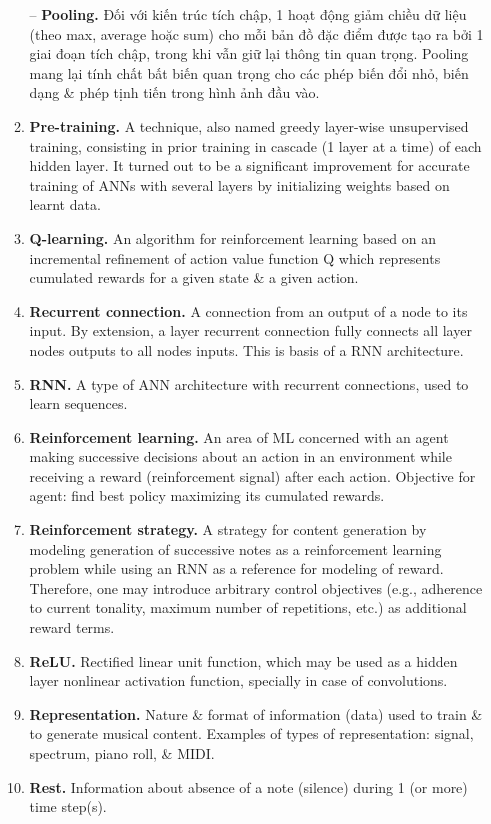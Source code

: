 \documentclass{article}
\begin{document}
\begin{itemize}
\begin{enumerate}
		-- {\bf Pooling.} Đối với kiến trúc tích chập, 1 hoạt động giảm chiều dữ liệu (theo max, average hoặc sum) cho mỗi bản đồ đặc điểm được tạo ra bởi 1 giai đoạn tích chập, trong khi vẫn giữ lại thông tin quan trọng. Pooling mang lại tính chất bất biến quan trọng cho các phép biến đổi nhỏ, biến dạng \& phép tịnh tiến trong hình ảnh đầu vào.
		\item {\bf Pre-training.} A technique, also named greedy layer-wise unsupervised training, consisting in prior training in cascade (1 layer at a time) of each hidden layer. It turned out to be a significant improvement for accurate training of ANNs with several layers by initializing weights based on learnt data.
		\item {\bf Q-learning.} An algorithm for reinforcement learning based on an incremental refinement of action value function Q which represents cumulated rewards for a given state \& a given action.
		\item {\bf Recurrent connection.} A connection from an output of a node to its input. By extension, a layer recurrent connection fully connects all layer nodes outputs to all nodes inputs. This is basis of a RNN architecture.
		\item {\bf RNN.} A type of ANN architecture with recurrent connections, used to learn sequences.
		\item {\bf Reinforcement learning.} An area of ML concerned with an agent making successive decisions about an action in an environment while receiving a reward (reinforcement signal) after each action. Objective for agent: find best policy maximizing its cumulated rewards.
		\item {\bf Reinforcement strategy.} A strategy for content generation by modeling generation of successive notes as a reinforcement learning problem while using an RNN as a reference for modeling of reward. Therefore, one may introduce arbitrary control objectives (e.g., adherence to current tonality, maximum number of repetitions, etc.) as additional reward terms.
		\item {\bf ReLU.} Rectified linear unit function, which may be used as a hidden layer nonlinear activation function, specially in case of convolutions.
		\item {\bf Representation.} Nature \& format of information (data) used to train \& to generate musical content. Examples of types of representation: signal, spectrum, piano roll, \& MIDI.
		\item {\bf Rest.} Information about absence of a note (silence) during 1 (or more) time step(s).

\end{enumerate}
\end{itemize}
\end{document}
